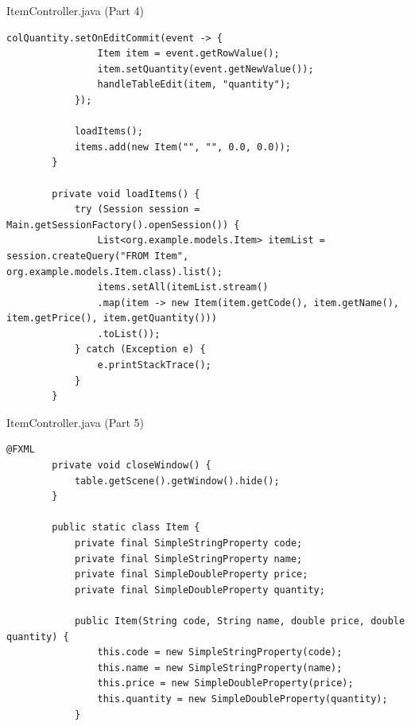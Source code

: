 \documentclass[aspectratio=169, table]{beamer}
\begin{document}
	\begin{frame}[fragile]{ItemController.java (Part 4)}
		\vspace{20pt}
		\begin{lstlisting}[style=JavaStyle]
			colQuantity.setOnEditCommit(event -> {
				Item item = event.getRowValue();
				item.setQuantity(event.getNewValue());
				handleTableEdit(item, "quantity");
			});
			
			loadItems();
			items.add(new Item("", "", 0.0, 0.0));
		}
		
		private void loadItems() {
			try (Session session = Main.getSessionFactory().openSession()) {
				List<org.example.models.Item> itemList = session.createQuery("FROM Item", org.example.models.Item.class).list();
				items.setAll(itemList.stream()
				.map(item -> new Item(item.getCode(), item.getName(), item.getPrice(), item.getQuantity()))
				.toList());
			} catch (Exception e) {
				e.printStackTrace();
			}
		}
	\end{lstlisting}
\end{frame}

\begin{frame}[fragile]{ItemController.java (Part 5)}
	\vspace{20pt}
	\begin{lstlisting}[style=JavaStyle]
		@FXML
		private void closeWindow() {
			table.getScene().getWindow().hide();
		}
		
		public static class Item {
			private final SimpleStringProperty code;
			private final SimpleStringProperty name;
			private final SimpleDoubleProperty price;
			private final SimpleDoubleProperty quantity;
			
			public Item(String code, String name, double price, double quantity) {
				this.code = new SimpleStringProperty(code);
				this.name = new SimpleStringProperty(name);
				this.price = new SimpleDoubleProperty(price);
				this.quantity = new SimpleDoubleProperty(quantity);
			}
		\end{lstlisting}
	\end{frame}
	
\end{document}
